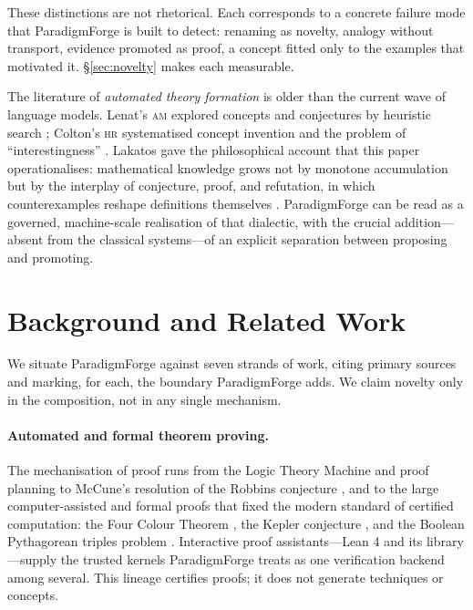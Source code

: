 \documentclass[11pt]{article}
\theoremstyle{definition}
\theoremstyle{remark}
\newcommand{\PF}{ParadigmForge}
\begin{document}
\noindent
These distinctions are not rhetorical. Each corresponds to a concrete failure mode that \PF{} is
built to detect: renaming as novelty, analogy without transport, evidence promoted as proof, a
concept fitted only to the examples that motivated it. \S\ref{sec:novelty} makes each measurable.

The literature of \emph{automated theory formation} is older than the current wave of language
models. Lenat's \textsc{am} explored concepts and conjectures by heuristic search
\citep{lenat1976am}; Colton's \textsc{hr} systematised concept invention and the problem of
``interestingness'' \citep{colton2002hr}. Lakatos gave the philosophical account that this paper
operationalises: mathematical knowledge grows not by monotone accumulation but by the interplay of
conjecture, proof, and refutation, in which counterexamples reshape definitions themselves
\citep{lakatos1976}. \PF{} can be read as a governed, machine-scale realisation of that dialectic,
with the crucial addition---absent from the classical systems---of an explicit separation between
proposing and promoting.

\section{Background and Related Work}
\label{sec:related}

We situate \PF{} against seven strands of work, citing primary sources and marking, for each,
the boundary \PF{} adds. We claim novelty only in the composition, not in any single mechanism.

\paragraph{Automated and formal theorem proving.}
The mechanisation of proof runs from the Logic Theory Machine \citep{newell1957} and proof planning
\citep{bundy1988} to McCune's resolution of the Robbins conjecture \citep{mccune1997}, and to the
large computer-assisted and formal proofs that fixed the modern standard of certified computation:
the Four Colour Theorem \citep{gonthier2008}, the Kepler conjecture \citep{hales2017}, and the
Boolean Pythagorean triples problem \citep{heule2016}. Interactive proof assistants---Lean 4 and
its library \citep{demoura2021lean4,mathlib2020}---supply the trusted kernels \PF{} treats as one
verification backend among several. This lineage certifies proofs; it does not generate techniques
or concepts.
\end{document}
